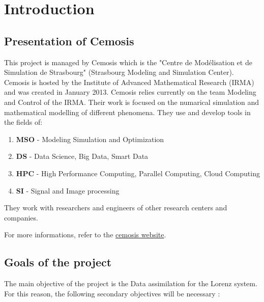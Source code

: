 \documentclass[12pt]{article}
\begin{document}
	\nocite{*}
	
	
	
	\tableofcontents
	
	\newpage
	\section{Introduction}
	
	\subsection{Presentation of Cemosis}
	
	This project is managed by Cemosis which is the "Centre de Modélisation et de Simulation de Strasbourg" (Strasbourg Modeling and Simulation Center). Cemosis is hosted by the Institute of Advanced Mathematical Research (IRMA) and was created in January 2013. Cemosis relies currently on the team Modeling and Control of the IRMA. Their work is focused on the numarical simulation and mathematical modelling of different phenomena. They use and develop tools in the fields of:
	
	\begin{enumerate}[label=\textbullet]
		\item \textbf{MSO} - Modeling Simulation and Optimization
		\item \textbf{DS} -	Data Science, Big Data, Smart Data
		\item \textbf{HPC} - High Performance Computing, Parallel Computing, Cloud Computing
		\item \textbf{SI} - Signal and Image processing
	\end{enumerate}
	\noindent They work with researchers and engineers of other research centers and companies.
	
	\noindent For more informations, refer to the \href{http://www.cemosis.fr/}{cemosis website}. 
	
	\subsection{Goals of the project}
	
	 The main objective of the project is the Data assimilation for the Lorenz system. For this reason, the following secondary objectives will be necessary :
 
\end{document}
